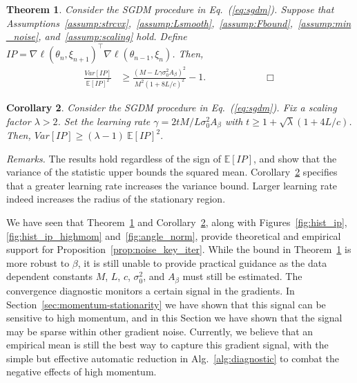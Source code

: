 \documentclass[conference]{IEEEtran}
\newcommand{\Ex}[1]{\mathbb{E}[ #1 ]}
\newtheorem{theorem}{Theorem}
\newtheorem{corollary}[theorem]{Corollary}
\begin{document}
\begin{theorem} 
\label{thm:ip_var_bound}
Consider the SGDM procedure in Eq.~(\ref{eq:sgdm}).
Suppose that Assumptions~\ref{assump:strcvx},~\ref{assump:Lsmooth},~\ref{assump:Fbound},~\ref{assump:min_noise}, and~\ref{assump:scaling} hold. Define\\ $IP = \nabla \ell(\theta_n, \xi_{n+1})^\top \nabla \ell(\theta_{n-1}, \xi_n)$. 
Then,
\begin{align*}
\frac{Var [ IP ]}{\mathbb{E} [ IP ]^2} 
&\geq \frac{ ( M - L \gamma \sigma_0^2 A_\beta )^2 }{M^2 ( 1 + 8 L / c )^2 } 
- 1.\hspace{1in}\Box
\end{align*}
\end{theorem}
\vspace{0.08in}
\begin{corollary}
\label{cor:set_gamma_threshold}
Consider the SGDM procedure in Eq.~(\ref{eq:sgdm}).
Fix a scaling factor $\lambda > 2$.
Set the learning rate $\gamma = 2 t M / L \sigma_0^2 A_\beta$ with $t  \geq 1 + \sqrt{ \lambda } ( 1 + 4 L / c )$. 
Then, $Var [IP] \geq (\lambda - 1) \ \Ex{IP}^2.$
\end{corollary}

\emph{Remarks.}
The results hold regardless of the sign of $ \Ex{IP}$, and show that the variance of the statistic upper bounds the squared mean. 
Corollary~\ref{cor:set_gamma_threshold} specifies that a greater learning rate increases the variance bound.
Larger learning rate indeed increases the radius of the stationary region.

We have seen that Theorem~\ref{thm:ip_var_bound} and Corollary~\ref{cor:set_gamma_threshold}, along with Figures~\ref{fig:hist_ip}, \ref{fig:hist_ip_highmom} and~\ref{fig:angle_norm}, provide theoretical and empirical support for Proposition~\ref{prop:noise_key_iter}. While the bound in Theorem~\ref{thm:ip_var_bound} is more robust to $\beta$, it is still unable to provide practical guidance as  the data dependent constants $M$, $L$, $c$, $\sigma_0^2$, and $A_\beta$ must still be estimated.
The convergence diagnostic monitors a certain signal in the gradients.
In Section~\ref{sec:momentum-stationarity} we have shown that this signal can be sensitive to high momentum, and in this Section we have shown that the signal may be sparse within other gradient noise.
Currently, we believe that an empirical mean is still the best way to capture this gradient signal, with the simple but effective automatic reduction in Alg.~\ref{alg:diagnostic} to combat the negative effects of high momentum. 
\end{document}
